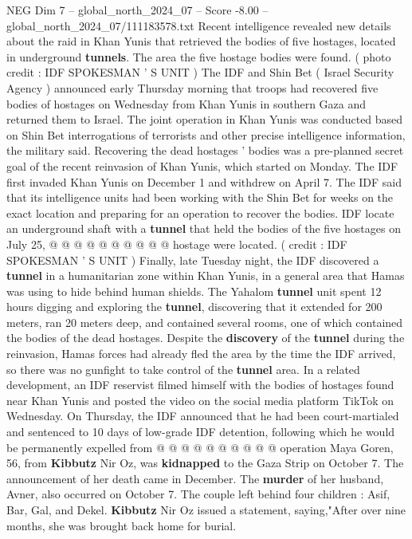\begin{textsample}{NEG Dim 7 – global\_north\_2024\_07 – Score -8.00 – global\_north\_2024\_07/111183578.txt}  \label{ex:f7_neg_118}
Recent intelligence revealed new details about the raid in Khan Yunis that retrieved the bodies of five hostages, located in underground \textbf{tunnels}.
The area the five hostage bodies were found. ( photo credit : IDF SPOKESMAN ' S UNIT ) The IDF and Shin Bet ( Israel Security Agency ) announced early Thursday morning that troops had recovered five bodies of hostages on Wednesday from Khan Yunis in southern Gaza and returned them to Israel.
The joint operation in Khan Yunis was conducted based on Shin Bet interrogations of terrorists and other precise intelligence information, the military said.
Recovering the dead hostages ' bodies was a pre-planned secret goal of the recent reinvasion of Khan Yunis, which started on Monday.
The IDF first invaded Khan Yunis on December 1 and withdrew on April 7.
The IDF said that its intelligence units had been working with the Shin Bet for weeks on the exact location and preparing for an operation to recover the bodies.
IDF locate an underground shaft with a \textbf{tunnel} that held the bodies of the five hostages on July 25, @ @ @ @ @ @ @ @ @ @ hostage were located. ( credit : IDF SPOKESMAN ' S UNIT ) Finally, late Tuesday night, the IDF discovered a \textbf{tunnel} in a humanitarian zone within Khan Yunis, in a general area that Hamas was using to hide behind human shields.
The Yahalom \textbf{tunnel} unit spent 12 hours digging and exploring the \textbf{tunnel}, discovering that it extended for 200 meters, ran 20 meters deep, and contained several rooms, one of which contained the bodies of the dead hostages.
Despite the \textbf{discovery} of the \textbf{tunnel} during the reinvasion, Hamas forces had already fled the area by the time the IDF arrived, so there was no gunfight to take control of the \textbf{tunnel} area.
In a related development, an IDF reservist filmed himself with the bodies of hostages found near Khan Yunis and posted the video on the social media platform TikTok on Wednesday.
On Thursday, the IDF announced that he had been court-martialed and sentenced to 10 days of low-grade IDF detention, following which he would be permanently expelled from @ @ @ @ @ @ @ @ @ @ operation Maya Goren, 56, from \textbf{Kibbutz} Nir Oz, was \textbf{kidnapped} to the Gaza Strip on October 7.
The announcement of her death came in December.
The \textbf{murder} of her husband, Avner, also occurred on October 7.
The couple left behind four children : Asif, Bar, Gal, and Dekel. \textbf{Kibbutz} Nir Oz issued a statement, saying,"After over nine months, she was brought back home for burial.

\end{textsample}
